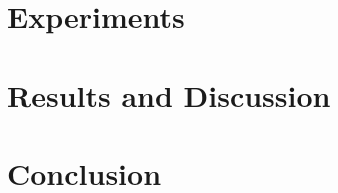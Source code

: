 \documentclass[numbers=noenddot,doktyp=marbeit,fontsize=12pt,sprache=english,hausschrift=true,draft=false]{TUBAFarbeiten}
\begin{document}
\section{Experiments}\label{sec:experiments}





\newpage

\section{Results and Discussion}\label{sec:results}






\newpage

\section{Conclusion}\label{sec:conclusion}



\newpage
\end{document}
